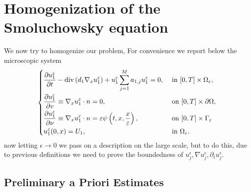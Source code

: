 \section{Homogenization of the Smoluchowsky equation}
We now try to homogenize our problem, For convenience we report below the microscopic system
\begin{equation}
    \begin{dcases}\frac{\partial u_{1}^{\epsilon}}{\partial t}-\operatorname{div}\left(d_{1} \nabla_{x} u_{1}^{\epsilon}\right)+u_{1}^{\epsilon} \sum_{j=1}^{M} a_{1, j} u_{1}^{\epsilon}=0, & \text { in }[0, T] \times \Omega_{\epsilon}, \\ 
    \frac{\partial u_{1}^{\epsilon}}{\partial v} \equiv \nabla_{x} u_{1}^{\epsilon} \cdot n=0, & \text { on }[0, T]\times\partial\Omega,\\ 
    \frac{\partial u_{1}^{\epsilon}}{\partial \nu} \equiv \nabla_{x} u_{1}^{\epsilon} \cdot n=\epsilon \psi\left(t, x, \frac{x}{\epsilon}\right), & \text { on }[0, T] \times \Gamma_{\epsilon} \\ u_{1}^{\epsilon}(0, x)=U_{1}, & \text { in } \Omega_{\epsilon}.
    \end{dcases}
\label{eq 10}\end{equation}
now letting $\epsilon \rightarrow 0$ we pass on a description on the large scale, but to do this, due to previous definitions we need to prove the boundedness of $u_{j}^{\epsilon}, \nabla u_{j}^{\epsilon}, \partial_{t} u_{j}^{\epsilon}$.

\subsection{Preliminary a Priori Estimates}

